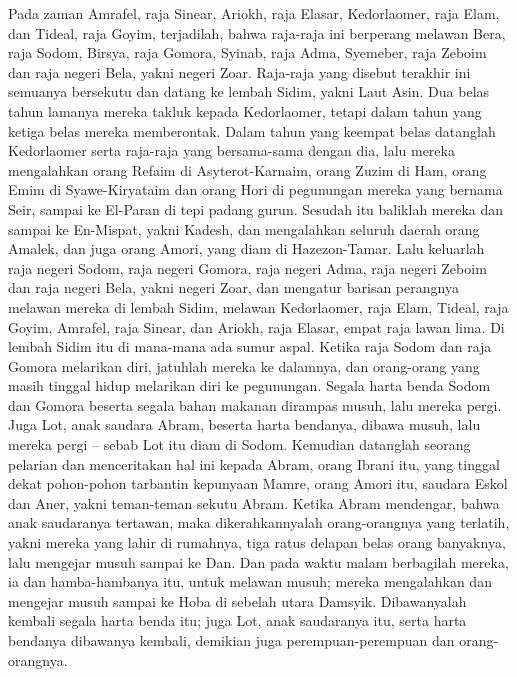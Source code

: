 \begin{biblechapter} %
 Pada zaman Amrafel, raja Sinear, Ariokh, raja Elasar, Kedorlaomer, raja Elam, dan Tideal, raja Goyim, terjadilah,
\verse bahwa raja-raja ini berperang melawan Bera, raja Sodom, Birsya, raja Gomora, Syinab, raja Adma, Syemeber, raja Zeboim dan raja negeri Bela, yakni negeri Zoar.
\verse Raja-raja yang disebut terakhir ini semuanya bersekutu dan datang ke lembah Sidim, yakni Laut Asin.
\verse Dua belas tahun lamanya mereka takluk kepada Kedorlaomer, tetapi dalam tahun yang ketiga belas mereka memberontak.
\verse Dalam tahun yang keempat belas datanglah Kedorlaomer serta raja-raja yang bersama-sama dengan dia, lalu mereka mengalahkan orang Refaim di Asyterot-Karnaim, orang Zuzim di Ham, orang Emim di Syawe-Kiryataim
\verse dan orang Hori di pegunungan mereka yang bernama Seir, sampai ke El-Paran di tepi padang gurun.
\verse Sesudah itu baliklah mereka dan sampai ke En-Mispat, yakni Kadesh, dan mengalahkan seluruh daerah orang Amalek, dan juga orang Amori, yang diam di Hazezon-Tamar.
\verse Lalu keluarlah raja negeri Sodom, raja negeri Gomora, raja negeri Adma, raja negeri Zeboim dan raja negeri Bela, yakni negeri Zoar, dan mengatur barisan perangnya melawan mereka di lembah Sidim,
\verse melawan Kedorlaomer, raja Elam, Tideal, raja Goyim, Amrafel, raja Sinear, dan Ariokh, raja Elasar, empat raja lawan lima.
\verse Di lembah Sidim itu di mana-mana ada sumur aspal. Ketika raja Sodom dan raja Gomora melarikan diri, jatuhlah mereka ke dalamnya, dan orang-orang yang masih tinggal hidup melarikan diri ke pegunungan.
\verse Segala harta benda Sodom dan Gomora beserta segala bahan makanan dirampas musuh, lalu mereka pergi.
\verse Juga Lot, anak saudara Abram, beserta harta bendanya, dibawa musuh, lalu mereka pergi -- sebab Lot itu diam di Sodom.
\verse Kemudian datanglah seorang pelarian dan menceritakan hal ini kepada Abram, orang Ibrani itu, yang tinggal dekat pohon-pohon tarbantin kepunyaan Mamre, orang Amori itu, saudara Eskol dan Aner, yakni teman-teman sekutu Abram.
\verse Ketika Abram mendengar, bahwa anak saudaranya tertawan, maka dikerahkannyalah orang-orangnya yang terlatih, yakni mereka yang lahir di rumahnya, tiga ratus delapan belas orang banyaknya, lalu mengejar musuh sampai ke Dan.
\verse Dan pada waktu malam berbagilah mereka, ia dan hamba-hambanya itu, untuk melawan musuh; mereka mengalahkan dan mengejar musuh sampai ke Hoba di sebelah utara Damsyik.
\verse Dibawanyalah kembali segala harta benda itu; juga Lot, anak saudaranya itu, serta harta bendanya dibawanya kembali, demikian juga perempuan-perempuan dan orang-orangnya.

\end{biblechapter}

